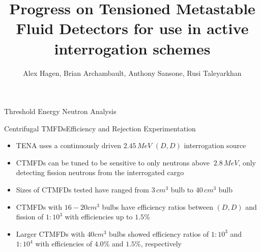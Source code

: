 

\title{Progress on Tensioned Metastable Fluid Detectors for use in active
       interrogation schemes}
\author{Alex Hagen, Brian Archambault,
        Anthony Sansone, Rusi Taleyarkhan}
\renewcommand{\today}{July 3, 2016}
\maketitle%
\hspace*{-1cm}%
\begin{cell}{6}{12}{Threshold Energy Neutron Analysis}{}
  \def\numheadings{1}
  \begin{cell}{4}{3}{Centrifugal TMFDs}{Efficiency and Rejection Experimentation}
    \begin{itemize}
      \item TENA uses a continuously driven $2.45\,MeV$ $\left(D,D\right)$ interrogation source
      \item CTMFDs can be tuned to be sensitive to only neutrons above $~2.8\,MeV$, only detecting fission neutrons from the interrogated cargo
      \item Sizes of CTMFDs tested have ranged from $3\,cm^{3}$ bulb to $40\,cm^{3}$ bulb
      \item CTMFDs with $16 - 20 cm^{3}$ bulbs have efficiency ratios between $\left(D,D\right)$ and fission of $1:10^{3}$ with efficiencies up to $1.5\%$
      \item Larger CTMFDs with $40 cm^{3}$ bulbs showed efficiency ratios of $1:10^{3}$ and $1:10^{4}$ with efficiencies of $4.0\%$ and $1.5\%$, respectively
    \end{itemize}
  \end{cell}%
  \hspace*{\fill}
  \begin{cell}{2}{3}{}{}
  \end{cell} \\
  \vspace*{\fill}
  \begin{cell}{2}{3}{}{}
  \end{cell}

\end{cell}
